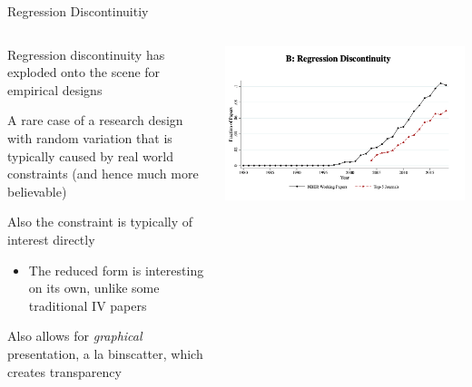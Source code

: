 \documentclass[notes,11pt, aspectratio=169]{beamer}
\newenvironment{wideitemize}{\itemize\addtolength{\itemsep}{10pt}}{\enditemize}
\begin{document}
\begin{frame}{Regression Discontinuitiy}
    \begin{columns}[onlytextwidth, T] %
      \begin{column}{.5\textwidth}
        \begin{wideitemize}
        \item Regression discontinuity has exploded onto the scene for empirical designs
        \item A rare case of a research design with random variation
          that is typically caused by real world constraints (and
          hence much more believable)
        \item Also the constraint is typically of interest directly
          \begin{itemize}
          \item The reduced form is interesting on its own, unlike
            some traditional IV papers
          \end{itemize}
        \item Also allows for \emph{graphical} presentation, a la
          binscatter, which creates transparency
        \end{wideitemize}
      \end{column}%
      \hfill%
      \begin{column}{.5\textwidth}
        \includegraphics[width=\linewidth]{images/rd_kleven_overtime.png}
      \end{column}%
    \end{columns}
\end{frame}
\end{document}
